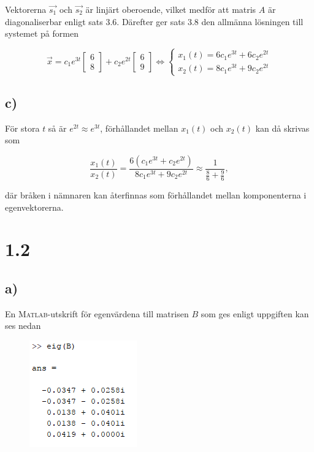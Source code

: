 \documentclass[a4paper]{article}
\newcommand{\mat}[1]{\bm{\mathit{#1}}}
\begin{document}
\noindent Vektorerna $\vec{s_1}$ och $\vec{s_2}$ är linjärt oberoende, vilket
medför att matris $\mat{A}$ är diagonaliserbar enligt sats 3.6. Därefter ger
sats 3.8 den allmänna lösningen till systemet på formen

\begin{equation*}
  \vec{x} = c_1e^{3t}\begin{bmatrix}6\\8\end{bmatrix} + c_2e^{2t}\begin{bmatrix}6\\9\end{bmatrix}
  \iff \begin{cases}
    x_1(t) = 6c_1e^{3t} + 6c_2e^{2t}\\
    x_2(t) = 8c_1e^{3t} + 9c_2e^{2t}
    \end{cases}
\end{equation*}

\subsection*{c)}

För stora $t$ så är $e^{2t} \approx e^{3t}$, förhållandet mellan $x_1(t)$ och
$x_2(t)$ kan då skrivas som

\begin{equation*}
  \frac{x_1(t)}{x_2(t)} = \frac{6(c_1e^{3t} + c_2e^{2t})}{8c_1e^{3t} + 9c_2e^{2t}} \approx \frac{1}{\frac 86 + \frac 96},
\end{equation*}

\noindent där bråken i nämnaren kan återfinnas som förhållandet mellan
komponenterna i egenvektorerna.

\section*{1.2}

\subsection*{a)}

En \textsc{Matlab}-utskrift för egenvärdena till matrisen $\mat{B}$ som ges enligt
uppgiften kan ses nedan

\FloatBarrier
\begin{figure}[h!]
  \centering
  \includegraphics[width=0.35\linewidth]{figurer/matlab_1_2_a.png}
\end{figure}
\FloatBarrier
\end{document}
